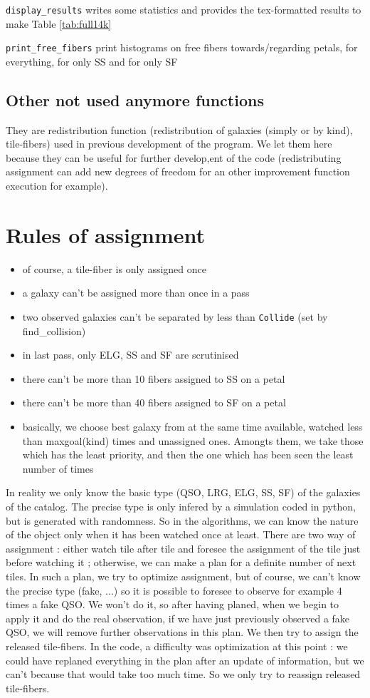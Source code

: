 \documentclass{article}
\begin{document}
{\tt display\_results} writes some statistics and provides the tex-formatted results to make Table \ref{tab:full14k}

{\tt print\_free\_fibers} print histograms on free fibers towards/regarding petals, for everything, for only SS and for only SF


\subsection{Other not used anymore functions}
They are redistribution function (redistribution of galaxies (simply or by kind), tile-fibers) used in previous development of the program. We let them here because they can be useful for further develop,ent of the code (redistributing assignment can add new degrees of freedom for an other improvement function execution for example).


\section{Rules of assignment}
\begin{itemize}
	\item of course, a tile-fiber is only assigned once
	\item a galaxy can't be assigned more than once in a pass
	\item two observed galaxies can't be separated by less than {\tt Collide} (set by find\_collision)
	\item in last pass, only ELG, SS and SF are scrutinised
	\item there can't be more than 10 fibers assigned to SS on a petal
	\item there can't be more than 40 fibers assigned to SF on a petal
	\item basically, we choose best galaxy from at the same time available, watched less than maxgoal(kind) times and unassigned ones. Amongts them, we take those which has the least priority, and then the one which has been seen the least number of times
\end{itemize}

In reality we only know the basic type (QSO, LRG, ELG, SS, SF) of the galaxies of the catalog. The precise type is only infered by a simulation coded in python, but is generated with randomness. So in the algorithms, we can know the nature of the object only when it has been watched once at least.
There are two way of assignment : either watch tile after tile and foresee the assignment of the tile just before watching it ; otherwise, we can make a plan for a definite number of next tiles. In such a plan, we try to optimize assignment, but of course, we can't know the precise type (fake, ...) so it is possible to foresee to observe for example 4 times a fake QSO. We won't do it, so after having planed, when we begin to apply it and do the real observation, if we have just previously observed a fake QSO, we will remove further observations in this plan. We then try to assign the released tile-fibers. In the code, a difficulty was optimization at this point : we could have replaned everything in the plan after an update of information, but we can't because that would take too much time. So we only try to reassign released tile-fibers.
\end{document}
